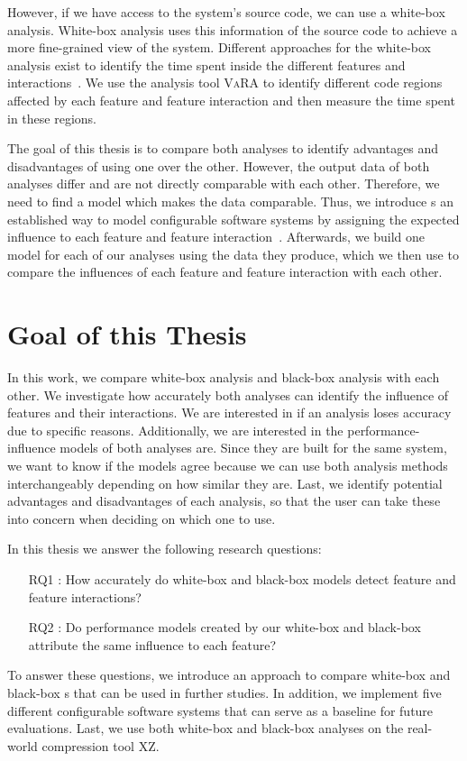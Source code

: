 However, if we have access to the system's source code, we can use a white-box analysis. 
White-box analysis uses this information of the source code to achieve a more fine-grained view of the system. 
Different approaches for the white-box analysis exist to identify the time spent inside the different features and interactions~\cite{Comprex, ConfigCrusher}.
We use the analysis tool \textsc{VaRA} to identify different code regions affected by each feature and feature interaction and then
measure the time spent in these regions.

The goal of this thesis is to compare both analyses to identify advantages and disadvantages of using one over the other. 
However, the output data of both analyses differ and are not directly comparable with each other.
Therefore, we need to find a model which makes the data comparable. 
Thus, we introduce {\perfInfluenceModel}s an established way to model configurable software systems by assigning the expected influence to each feature 
and feature interaction~\cite{Performance-influence-models-for-highly-configurable-systems}. 
Afterwards, we build one model for each of our analyses using the data they produce, which we then use to compare the influences of each feature
and feature interaction with each other.

\section{Goal of this Thesis}
In this work, we compare white-box analysis and black-box analysis with each other. 
We investigate how accurately both analyses can identify the influence of features and their interactions.
We are interested in if an analysis loses accuracy due to specific reasons.
Additionally, we are interested in the performance-influence models of both analyses are. 
Since they are built for the same system, we want to know if the models agree because we can use both analysis 
methods interchangeably depending on how similar they are.
Last, we identify potential advantages and disadvantages of each analysis, so that the user can take these into concern when deciding on which 
one to use.

In this thesis we answer the following research questions:

\begin{itemize}\label{researchQuestions}
    \item[RQ1]: How accurately do white-box and black-box models detect feature and feature interactions? 
    \item[RQ2]: Do performance models created by our white-box and black-box attribute the same influence to each feature?
\end{itemize}

To answer these questions, we introduce an approach to compare white-box and black-box {\perfInfluenceModel}s that can be used in further studies.
In addition, we implement five different configurable software systems that can serve as a baseline for future evaluations.
Last, we use both white-box and black-box analyses on the real-world compression tool \textsc{XZ}. 
